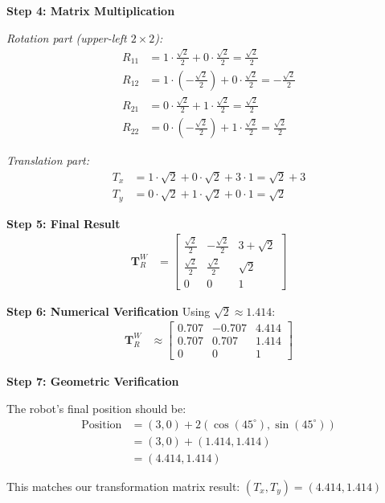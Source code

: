 \documentclass[11pt,a4paper]{article}
\begin{document}
\textbf{Step 4: Matrix Multiplication}

\textit{Rotation part (upper-left $2 \times 2$):}
\begin{align}
R_{11} &= 1 \cdot \frac{\sqrt{2}}{2} + 0 \cdot \frac{\sqrt{2}}{2} = \frac{\sqrt{2}}{2} \\
R_{12} &= 1 \cdot (-\frac{\sqrt{2}}{2}) + 0 \cdot \frac{\sqrt{2}}{2} = -\frac{\sqrt{2}}{2} \\
R_{21} &= 0 \cdot \frac{\sqrt{2}}{2} + 1 \cdot \frac{\sqrt{2}}{2} = \frac{\sqrt{2}}{2} \\
R_{22} &= 0 \cdot (-\frac{\sqrt{2}}{2}) + 1 \cdot \frac{\sqrt{2}}{2} = \frac{\sqrt{2}}{2}
\end{align}

\textit{Translation part:}
\begin{align}
T_x &= 1 \cdot \sqrt{2} + 0 \cdot \sqrt{2} + 3 \cdot 1 = \sqrt{2} + 3 \\
T_y &= 0 \cdot \sqrt{2} + 1 \cdot \sqrt{2} + 0 \cdot 1 = \sqrt{2}
\end{align}

\textbf{Step 5: Final Result}
\begin{align}
\bm{T}_R^W &= \begin{bmatrix}
\frac{\sqrt{2}}{2} & -\frac{\sqrt{2}}{2} & 3 + \sqrt{2} \\
\frac{\sqrt{2}}{2} & \frac{\sqrt{2}}{2} & \sqrt{2} \\
0 & 0 & 1
\end{bmatrix}
\end{align}

\textbf{Step 6: Numerical Verification}
Using $\sqrt{2} \approx 1.414$:
\begin{align}
\bm{T}_R^W &\approx \begin{bmatrix}
0.707 & -0.707 & 4.414 \\
0.707 & 0.707 & 1.414 \\
0 & 0 & 1
\end{bmatrix}
\end{align}

\textbf{Step 7: Geometric Verification}

The robot's final position should be:
\begin{align}
\text{Position} &= (3, 0) + 2(\cos(45^{\circ}), \sin(45^{\circ})) \\
&= (3, 0) + (1.414, 1.414) \\
&= (4.414, 1.414)
\end{align}

This matches our transformation matrix result: $(T_x, T_y) = (4.414, 1.414)$ \checkmark
\end{document}
